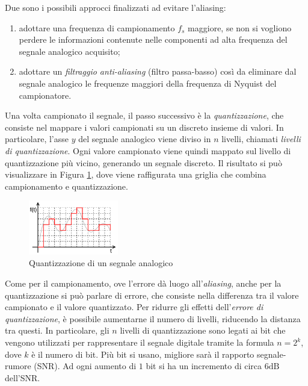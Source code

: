 \documentclass[a4paper,12pt]{report}  %
\begin{document}
Due sono i possibili approcci finalizzati ad evitare l'aliasing:
\begin{enumerate}
    \item adottare una frequenza di campionamento $f_s$ maggiore, se non si vogliono perdere le informazioni contenute nelle componenti ad alta frequenza del segnale analogico acquisito;
    \item adottare un \textit{filtraggio anti-aliasing} (filtro passa-basso) così da eliminare dal segnale analogico le frequenze maggiori della frequenza di Nyquist del campionatore.
\end{enumerate}

Una volta campionato il segnale, il passo successivo è la \textit{quantizzazione}, che consiste nel mappare i valori campionati su un discreto insieme di valori.
In particolare, l'asse $y$ del segnale analogico viene diviso in $n$ livelli, chiamati \textit{livelli di quantizzazione}.
Ogni valore campionato viene quindi mappato sul livello di quantizzazione più vicino, generando un segnale discreto.
Il risultato si può visualizzare in Figura \ref{fig:quantization}, dove viene raffigurata una griglia che combina campionamento e quantizzazione.

\begin{figure}[h]
    \centering
    \includegraphics[width=0.35\textwidth]{imgs/Quantization.png}
    \caption{Quantizzazione di un segnale analogico}
    \label{fig:quantization}
\end{figure}

Come per il campionamento, ove l'errore dà luogo all'\textit{aliasing}, anche per la quantizzazione si può parlare di errore, che consiste nella differenza tra il valore campionato e il valore quantizzato.
Per ridurre gli effetti dell'\textit{errore di quantizzazione}, è possibile aumentarne il numero di livelli, riducendo la distanza tra questi.
In particolare, gli $n$ livelli di quantizzazione sono legati ai bit che vengono utilizzati per rappresentare il segnale digitale tramite la formula $n = 2^k$, dove $k$ è il numero di bit.
Più bit si usano, migliore sarà il rapporto segnale-rumore (SNR).
Ad ogni aumento di $1$ bit si ha un incremento di circa $6 \text{dB}$ dell'SNR.
\end{document}
